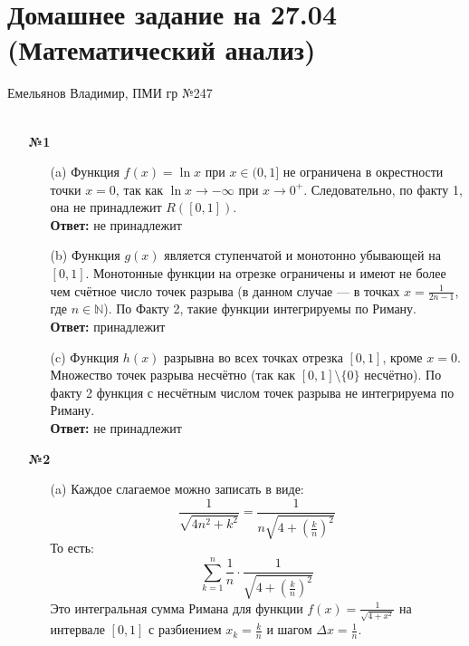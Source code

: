 \documentclass[a4paper]{article}
\begin{document}
\section*{Домашнее задание на 27.04 (Математический анализ)}
 {\large Емельянов Владимир, ПМИ гр №247}\\\\
\begin{enumerate}
    \item[\textbf{№1}]
    \begin{enumerate}
        \item[(a)]
        Функция \( f(x) = \ln x \) при \( x \in (0, 1] \) не ограничена в окрестности точки \( x = 0 \), так как \( \ln x \to -\infty \) при \( x \to 0^+ \). 
        Следовательно, по факту 1, она не принадлежит \( R([0, 1]) \).\\
        \textbf{Ответ: } не принадлежит

        \item[(b)]Функция \( g(x) \) является ступенчатой и монотонно убывающей на \([0, 1]\).
        Монотонные функции на отрезке ограничены и имеют не более чем счётное число точек разрыва (в данном случае — в точках \( x = \frac{1}{2n-1} \), где \( n \in \mathbb{N} \)).
        По Факту 2, такие функции интегрируемы по Риману.\\
        \textbf{Ответ: } принадлежит

        \item[(c)]Функция \( h(x) \) разрывна во всех точках отрезка \([0, 1]\), кроме \( x = 0 \).
        Множество точек разрыва несчётно (так как \([0, 1] \setminus \{0\}\) несчётно). 
        По факту 2 функция с несчётным числом точек разрыва не интегрируема по Риману.\\
        \textbf{Ответ: } не принадлежит
    \end{enumerate}

    \item[\textbf{№2}]
    \begin{enumerate}
        \item[(a)] Каждое слагаемое можно записать в виде:  
        \[
        \frac{1}{\sqrt{4n^2 + k^2}} = \frac{1}{n \sqrt{4 + \left(\frac{k}{n}\right)^2}}
        \]  
        То есть:
        \[
        \sum_{k=1}^{n} \frac{1}{n} \cdot \frac{1}{\sqrt{4 + \left(\frac{k}{n}\right)^2}}
        \]
        Это интегральная сумма Римана для функции \( f(x) = \frac{1}{\sqrt{4 + x^2}} \) на интервале \([0, 1]\) с разбиением \( x_k = \frac{k}{n} \) и шагом \( \Delta x = \frac{1}{n} \). 
    

\end{enumerate}
\end{enumerate}
\end{document}
